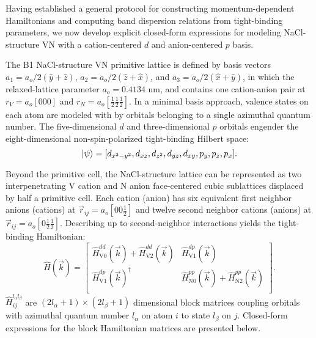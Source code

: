 \documentclass[twocolumn,showpacs,preprintnumbers,superscriptaddress,prb,floatfix,aps,10pt]{revtex4-1}
\newcommand*{\ham}{\hat{H}}
\newcommand*{\bondvec}{\vec{r}_{ij}}
\begin{document}
Having established a general protocol for constructing momentum-dependent Hamiltonians and computing band dispersion relations from tight-binding parameters, we now develop explicit closed-form expressions for modeling NaCl-structure VN with a cation-centered $d$ and anion-centered $p$ basis. 

The B1 NaCl-structure VN primitive lattice is defined by basis vectors $a_1 = a_o/2 (\hat{y} + \hat{z})$, $a_2 = a_o/2 (\hat{z} + \hat{x})$, and $a_3 = a_o/2 (\hat{x} + \hat{y})$, in which the relaxed-lattice parameter $a_o = 0.4134$ nm, and contains one cation-anion pair at $r_V = a_o[000]$ and $r_N = a_o[\frac{1}{2}\frac{1}{2}\frac{1}{2}]$. In a minimal basis approach, valence states on each atom are modeled with by orbitals belonging to a single azimuthal quantum number. The five-dimensional $d$ and three-dimensional $p$ orbitals engender the eight-dimensional non-spin-polarized tight-binding Hilbert space:
\begin{equation}
\label{eq:hilbert}
\ket{\psi} =
[ d_{x^2-y^2},
  d_{xz},
  d_{z^2}, 
  d_{yz},
  d_{xy},
  p_{y},
  p_{z},
  p_{x}] .
\end{equation}

Beyond the primitive cell, the NaCl-structure lattice can be represented as two interpenetrating V cation and N anion face-centered cubic sublattices displaced by half a primitive cell. Each cation (anion) has six equivalent first neighbor anions (cations) at $\bondvec = a_o [0 0 \frac{1}{2}]$ and twelve second neighbor cations (anions) at $\bondvec = a_o[0 \frac{1}{2} \frac{1}{2}]$. Describing up to second-neighbor interactions yields the tight-binding Hamiltonian:
%
\begin{equation}
\label{eq:ham_explicit}
\ham(\vec{k}) = 
\begin{bmatrix}
\ham_{\textrm{V}0}^{dd}(\vec{k}) + \ham_{\textrm{V}2}^{dd}(\vec{k}) &\ham_{\textrm{V}1}^{dp}(\vec{k}) \\
\ham_{\textrm{V}1}^{dp}(\vec{k})^{\dagger} & \ham_{\textrm{N}0}^{pp}(\vec{k}) + \ham_{\textrm{N}2}^{pp}(\vec{k}) \\
\end{bmatrix} .
\end{equation}
%
$\ham_{ij}^{l_\alpha l_\beta}$ are $(2l_\alpha+1)\times(2l_\beta+1)$ dimensional block matrices coupling orbitals with azimuthal quantum number $l_\alpha$ on atom $i$ to state $l_\beta$ on $j$. Closed-form expressions for the block Hamiltonian matrices are presented below.
\end{document}
